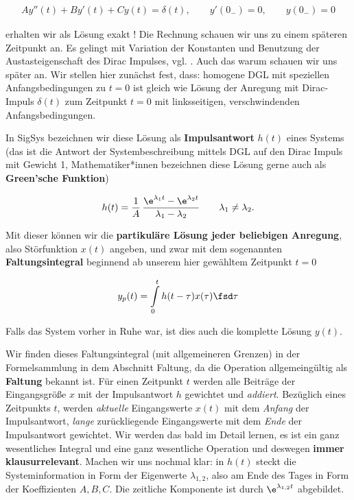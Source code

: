 \begin{mdframed}[backgroundcolor=C3!10]
\begin{align}
A y''(t) + B y'(t) + C y(t) = \delta(t),\qquad y'(0_-) = 0,\qquad y(0_-) = 0
\end{align}
\end{mdframed}
erhalten wir als Lösung exakt !
%
Die Rechnung schauen wir uns zu einem späteren Zeitpunkt an. Es gelingt mit Variation
der Konstanten und Benutzung der Austasteigenschaft des Dirac Impulses,
vgl. \cite[S.133ff]{Strang2014}.
%
Auch das warum schauen wir uns später an. Wir stellen hier zunächst fest, dass:
homogene DGL mit speziellen Anfangsbedingungen zu $t=0$ ist gleich wie
Lösung der Anregung mit Dirac-Impuls $\delta(t)$ zum Zeitpunkt $t=0$ mit
linksseitigen, verschwindenden Anfangsbedingungen.

In SigSys bezeichnen wir diese Lösung als \textbf{Impulsantwort} $h(t)$
eines Systems (das ist die Antwort der Systembeschreibung mittels DGL auf den
Dirac Impuls mit Gewicht 1, Mathematiker*innen
bezeichnen diese Lösung gerne auch als \textbf{Green'sche Funktion})
\begin{mdframed}[backgroundcolor=C3!10]
\begin{align}
h(t) =
\frac{1}{A}\,\frac{\e^{\lambda_1 t} - \e^{\lambda_2 t}}{\lambda_1 - \lambda_2}
\qquad \lambda_1 \neq \lambda_2.
\end{align}
\end{mdframed}

Mit dieser können wir die \textbf{partikuläre Lösung jeder beliebigen Anregung},
also Störfunktion $x(t)$ angeben, und zwar mit dem sogenannten
\textbf{Faltungsintegral} beginnend ab unserem hier gewähltem
Zeitpunkt $t=0$
%
\begin{mdframed}[backgroundcolor=C3!10]
\begin{equation}
y_p(t) = \int\limits_{0}^{t} h(t-\tau) x(\tau) \fsd \tau
\end{equation}
\end{mdframed}
%
Falls das System vorher in Ruhe war, ist dies auch die komplette Lösung $y(t)$.
%

Wir finden dieses Faltungsintegral (mit allgemeineren Grenzen) in der
Formelsammlung in dem Abschnitt Faltung, da die Operation allgemeingültig als
\textbf{Faltung} bekannt ist.
%
Für einen Zeitpunkt $t$ werden alle Beiträge der Eingangsgröße $x$ mit der Impulsantwort $h$
gewichtet und \textit{addiert}. Bezüglich eines Zeitpunkts $t$, werden \textit{aktuelle}
Eingangswerte $x(t)$ mit dem \textit{Anfang} der Impulsantwort, \textit{lange}
zurückliegende Eingangswerte mit dem \textit{Ende} der Impulsantwort gewichtet.
%
Wir werden das bald im Detail lernen, es ist ein ganz wesentliches Integral und
eine ganz wesentliche Operation und deswegen \textbf{immer klausurrelevant}.
%
Machen wir uns nochmal klar: in $h(t)$ steckt die Systeminformation in Form
der Eigenwerte $\lambda_{1,2}$, also am Ende des Tages in Form der Koeffizienten $A,B,C$.
Die zeitliche Komponente ist durch $\e^{\lambda_{1,2} t}$ abgebildet.

